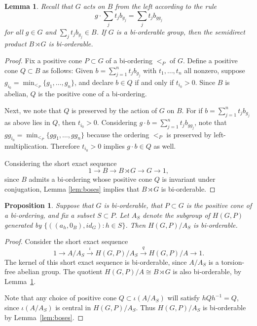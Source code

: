 \documentclass{amsart}
\newtheorem{lemma}[theorem]{Lemma}
\newtheorem{proposition}[theorem]{Proposition}
\theoremstyle{definition}
\theoremstyle{remark}
\begin{document}
\begin{lemma}
\label{lem:BOsemidirectproduct}
Recall that $G$ acts on $B$ from the left according to the rule \[ g \cdot \sum_j t_jb_{g_j} = \sum_j t_jb_{gg_j}
\]    
for all $g \in G$ and $\sum_j t_jb_{g_j} \in B$.  If $G$ is a bi-orderable group, then the semidirect product $B \rtimes G$ is bi-orderable.
\end{lemma}
\begin{proof}
Fix a positive cone $P \subset G$ of a bi-ordering $<_P$ of $G$. Define a positive cone $Q \subset B$ as follows: Given $b = \sum_{j=1}^n t_j b_{g_j}$ with $t_1, \ldots, t_n$ all nonzero, suppose $g_{i_0} = \min_{<_P}\{g_1, \ldots, g_n\}$, and declare $b \in Q$ if and only if $t_{i_0}>0$.  Since $B$ is abelian, $Q$ is the positive cone of a bi-ordering.

Next, we note that $Q$ is preserved by the action of $G$ on $B$.  For if $b = \sum_{j=1}^n t_j b_{g_j}$ as above lies in $Q$, then $t_{i_0} >0$.  Considering $g \cdot b =  \sum_{j=1}^n t_j b_{gg_j}$, note that $gg_{i_0} = \min_{<_P}\{gg_1, \ldots, gg_n\}$ because the ordering $<_P$ is preserved by left-multiplication.  Therefore $t_{i_0}>0$ implies $g \cdot b \in Q$ as well.

Considering the short exact sequence
\[ 1 \longrightarrow B \longrightarrow B \rtimes G \longrightarrow G \longrightarrow 1,
\]
since $B$ admits a bi-ordering whose positive cone $Q$ is invariant under conjugation, Lemma \ref{lem:boses} implies that $B \rtimes G$ is bi-orderable.
\end{proof}

\begin{proposition}
\label{lem:boquotient}
Suppose that $G$ is bi-orderable, that $P \subset G$ is the positive cone of a bi-ordering, and fix a subset $S \subset P$.  Let $A_S$ denote the subgroup of $H(G,P)$ generated by $\{ ((a_h, 0_B), id_G):h \in S\}$.   Then $H(G,P)/A_S$ is bi-orderable.
\end{proposition}
\begin{proof}
Consider the short exact sequence
\[ 1 \longrightarrow A/A_S \stackrel{\iota}{\longrightarrow} H(G,P)/A_S \stackrel{q}{\longrightarrow} H(G,P)/A \longrightarrow 1.
\]
The kernel of this short exact sequence is bi-orderable, since $A/A_S$ is a torsion-free abelian group.  The quotient $H(G,P)/A \cong B \rtimes G$ is also bi-orderable, by Lemma~\ref{lem:BOsemidirectproduct}.

Note that any choice of positive cone $Q \subset \iota(A/A_S)$ will satisfy $hQh^{-1} =Q$, since $\iota(A/A_S)$ is central in $H(G,P)/A_S$.  Thus $H(G,P)/A_S$ is bi-orderable by Lemma~\ref{lem:boses}.
\end{proof}
\end{document}
